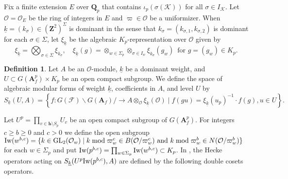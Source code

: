 \documentclass[leqno]{amsart}
\theoremstyle{definition}
\newtheorem{defn}[thm]{Definition}
\theoremstyle{remark}
\newcommand{\oo}{\mathcal{O}}
\newcommand{\Z}{{\mathbf{Z}}}
\newcommand{\Qp}{\mathbf{Q}_p}
\newcommand{\A}{\mathbf A}
\newcommand{\finite}{\mathbf{h}}
\DeclareMathOperator{\GL}{GL}
\newcommand{\F}{{\mathcal{F}}} %
\newcommand{\K}{{\mathcal{K}}} %
\newcommand{\wt}[1]{\underline{ #1 }}
\newcommand{\Iw}{\textnormal{Iw}} %
\begin{document}
Fix a finite extension $E$ over $\Qp$
that contains $\iota_p(\sigma(\K))$
for all $\sigma\in I_\K$.
Let $\oo=\oo_E$ be the ring of integers in $E$ and
$\varpi\in\oo$ be a uniformizer.
When $\wt{k}=(k_\sigma)\in (\Z^2)^{\Sigma}$
is dominant in the sense that
$k_\sigma=(k_{\sigma,1},k_{\sigma,2})$
is dominant for each $\sigma\in \Sigma$,
let $\xi_{\wt{k}}$ be
the algebraic $K_p$-representation over $\oo$ given by
\begin{equation*}
	\xi_{\wt{k}}=\bigotimes_{\sigma\in \Sigma}
	\xi_{k_\sigma},\quad
	\xi_{\wt{k}}(g)=
	\otimes_{w\in \Sigma_p}
	\otimes_{\sigma\in I_w}\xi_{k_\sigma}(g_w)\,
	\text{ for } g=(g_w)\in K_p.
\end{equation*}

\begin{defn}\label{def:algform}
Let $A$ be an $\oo$-module,
$\wt{k}$ be a dominant weight,
and $U\subset G(\A_f^p)\times K_p$ be an open compact subgroup.
We define the space of algebraic modular forms
of weight $\wt{k}$, coefficients in $A$,
and level $U$ by
\begin{equation*}
S_{\wt{k}}(U,A)=
\left\{ f: G(\F)\backslash G(\A_f)/
\rightarrow A\otimes_{\oo}\xi_{\wt{k}}(\oo)
\mid f(gu)=\xi_{\wt{k}}(u_p)^{-1}\cdot f(g), u\in U\right\}.
\end{equation*}
\end{defn}

Let $U^p=\prod_{v\in\finite\setminus{S_p}}U_v$
be an open compact subgroup of $G(\A_f^p)$.
For integers $c\geq b\geq 0$ and $c>0$ we define the open subgroup
$\Iw(w^{b,c})=\{k\in \GL_2(\oo_w)\mid 
k \bmod \varpi_w^c \in B(\oo/\varpi_w^c)
\text{ and } k \bmod \varpi_w^b \in N(\oo/\varpi_w^b)\}$
for each $w\in \Sigma_p$ and put
$\Iw(p^{b,c})=\prod_{w\in \Sigma_p}\Iw(w^{b,c})\subset K_p$.
In \cite{ger}, the Hecke operators acting on 
$S_{\wt{k}}(U^p\Iw(p^{b,c}),A)$
are defined by the following double cosets operators.
\end{document}
